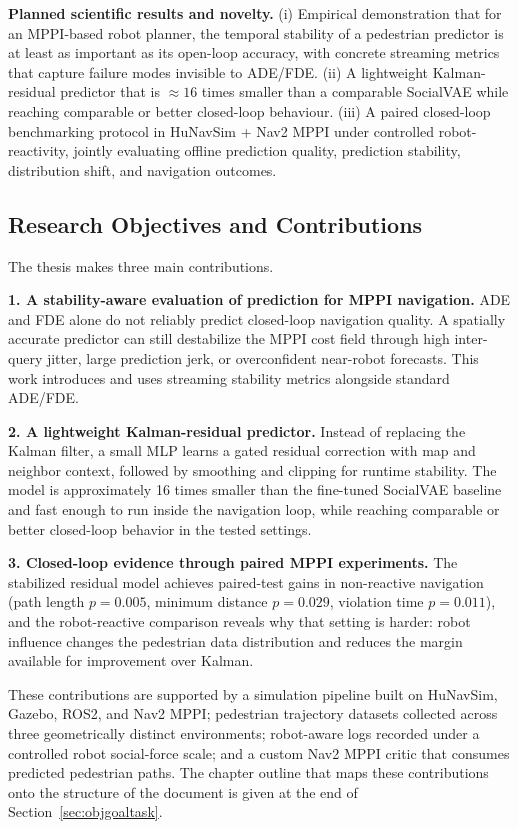 \documentclass[12pt, a4paper]{article}
\begin{document}
\textbf{Planned scientific results and novelty.} (i) Empirical demonstration that for an MPPI-based robot planner, the temporal stability of a pedestrian predictor is at least as important as its open-loop accuracy, with concrete streaming metrics that capture failure modes invisible to ADE/FDE. (ii) A lightweight Kalman-residual predictor that is $\approx 16$ times smaller than a comparable SocialVAE while reaching comparable or better closed-loop behaviour. (iii) A paired closed-loop benchmarking protocol in HuNavSim + Nav2 MPPI under controlled robot-reactivity, jointly evaluating offline prediction quality, prediction stability, distribution shift, and navigation outcomes.

\subsection{Research Objectives and Contributions}

The thesis makes three main contributions.

\textbf{1. A stability-aware evaluation of prediction for MPPI navigation.} ADE and FDE alone do not reliably predict closed-loop navigation quality. A spatially accurate predictor can still destabilize the MPPI cost field through high inter-query jitter, large prediction jerk, or overconfident near-robot forecasts. This work introduces and uses streaming stability metrics alongside standard ADE/FDE.

\textbf{2. A lightweight Kalman-residual predictor.} Instead of replacing the Kalman filter, a small MLP learns a gated residual correction with map and neighbor context, followed by smoothing and clipping for runtime stability. The model is approximately 16 times smaller than the fine-tuned SocialVAE baseline and fast enough to run inside the navigation loop, while reaching comparable or better closed-loop behavior in the tested settings.

\textbf{3. Closed-loop evidence through paired MPPI experiments.} The stabilized residual model achieves paired-test gains in non-reactive navigation (path length $p=0.005$, minimum distance $p=0.029$, violation time $p=0.011$), and the robot-reactive comparison reveals why that setting is harder: robot influence changes the pedestrian data distribution and reduces the margin available for improvement over Kalman.

These contributions are supported by a simulation pipeline built on HuNavSim, Gazebo, ROS2, and Nav2 MPPI; pedestrian trajectory datasets collected across three geometrically distinct environments; robot-aware logs recorded under a controlled robot social-force scale; and a custom Nav2 MPPI critic that consumes predicted pedestrian paths. The chapter outline that maps these contributions onto the structure of the document is given at the end of Section~\ref{sec:objgoaltask}.
\end{document}
